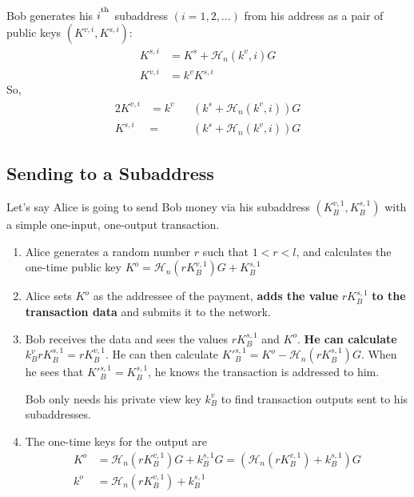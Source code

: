 Bob generates his $i^\textsuperscript{th}$ subaddress $(i = 1, 2, ...)$ from his address as a pair of public keys $(K^{v,i}, K^{s,i})$:\\
\begin{align*}
    K^{s,i} &= K^s + \mathcal{H}_n(k^v, i) G\\
    K^{v,i} &= k^v K^{s,i}
\end{align*}
\quad So,
\begin{alignat*}{2}
    K^{v,i} &= k^v&&(k^s + \mathcal{H}_n(k^v, i))G\\
    K^{s,i} &= &&(k^s + \mathcal{H}_n(k^v, i))G
\end{alignat*}
    

\subsection{Sending to a Subaddress}
    
Let's say Alice is going to send Bob money via his subaddress $(K_B^{v,1}, K_B^{s,1})$ with a simple one-input, one-output transaction.
\begin{enumerate}
	\item Alice generates a random number $r$ such that $1 < r < l$, and calculates the one-time public key $K^o  = \mathcal{H}_n(r K_B^{v,1})G + K_B^{s,1}$ 

	\item Alice sets $K^o$ as the addressee of the payment, \textbf{adds the value} $r K_B^{s,1}$ \textbf{to the transaction data} and submits it to the network.
	
	\item Bob receives the data and sees the values $r K_B^{s,1}$ and $K^o$. \textbf{He can calculate} $k_B^v r K_B^{s,1} = r K_B^{v,1}$. He can then calculate $K'^{s,1}_B = K^o - \mathcal{H}_n(r K_B^{s,1})G$. When he sees that $K'^{s,1}_B = K^{s,1}_B$, he knows the transaction is addressed to him.
	
	Bob only needs his private view key $k_B^v$ to find transaction outputs sent to his subaddresses.
	
	\item The one-time keys for the output are
	\begin{align*}
		K^o &= \mathcal{H}_n(r K_B^{v,1})G + k_B^{s,1} G = (\mathcal{H}_n(r K_B^{v,1}) + k_B^{s,1})G  \\ 
		k^o &= \mathcal{H}_n(r K_B^{v,1}) + k_B^{s,1}
	\end{align*}
\end{enumerate}

